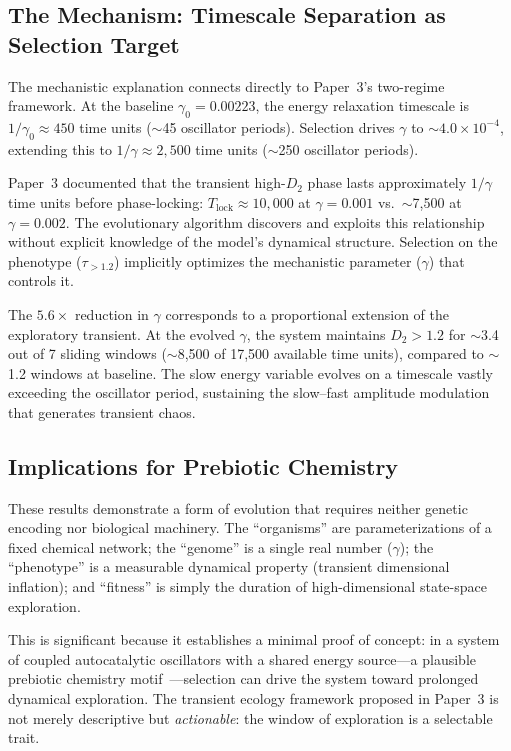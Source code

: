 \documentclass[twocolumn,showpacs,preprintnumbers,amsmath,amssymb,prd,floatfix]{revtex4-2}
\newcommand{\tauexp}{\tau_{>1.2}}
\newcommand{\Tlock}{T_{\mathrm{lock}}}
\newcommand{\Dtwo}{D_2}
\begin{document}
\subsection{The Mechanism: Timescale Separation as Selection Target}

The mechanistic explanation connects directly to Paper~3's two-regime framework. At the baseline $\gamma_0 = 0.00223$, the energy relaxation timescale is $1/\gamma_0 \approx 450$ time units ($\sim$45 oscillator periods). Selection drives $\gamma$ to $\sim$$4.0 \times 10^{-4}$, extending this to $1/\gamma \approx 2{,}500$ time units ($\sim$250 oscillator periods).

Paper~3 documented that the transient high-$\Dtwo$ phase lasts approximately $1/\gamma$ time units before phase-locking: $\Tlock \approx 10{,}000$ at $\gamma = 0.001$ vs.\ $\sim$7{,}500 at $\gamma = 0.002$. The evolutionary algorithm discovers and exploits this relationship without explicit knowledge of the model's dynamical structure. Selection on the phenotype ($\tauexp$) implicitly optimizes the mechanistic parameter ($\gamma$) that controls it.

The $5.6\times$ reduction in $\gamma$ corresponds to a proportional extension of the exploratory transient. At the evolved $\gamma$, the system maintains $\Dtwo > 1.2$ for $\sim$3.4 out of 7 sliding windows ($\sim$8{,}500 of 17{,}500 available time units), compared to $\sim$1.2 windows at baseline. The slow energy variable evolves on a timescale vastly exceeding the oscillator period, sustaining the slow--fast amplitude modulation that generates transient chaos.

\subsection{Implications for Prebiotic Chemistry}

These results demonstrate a form of evolution that requires neither genetic encoding nor biological machinery. The ``organisms'' are parameterizations of a fixed chemical network; the ``genome'' is a single real number ($\gamma$); the ``phenotype'' is a measurable dynamical property (transient dimensional inflation); and ``fitness'' is simply the duration of high-dimensional state-space exploration.

This is significant because it establishes a minimal proof of concept: in a system of coupled autocatalytic oscillators with a shared energy source---a plausible prebiotic chemistry motif~\cite{kauffman1986, eigen1971}---selection can drive the system toward prolonged dynamical exploration. The transient ecology framework proposed in Paper~3 is not merely descriptive but \textit{actionable}: the window of exploration is a selectable trait.
\end{document}
